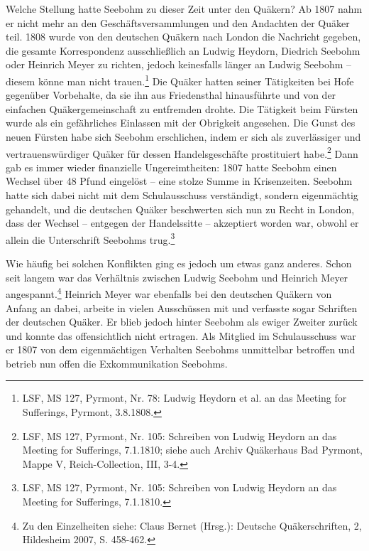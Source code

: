 Welche Stellung hatte Seebohm zu dieser Zeit unter den Quäkern? Ab 1807 nahm er
nicht mehr an den Geschäftsversammlungen und
den Andachten der Quäker teil. 1808 wurde von den
deutschen Quäkern nach London die Nachricht
gegeben, die gesamte Korrespondenz ausschließlich an Ludwig
Heydorn, Diedrich
Seebohm oder Heinrich
Meyer zu richten, jedoch keinesfalls länger an
Ludwig Seebohm -- diesem könne man nicht trauen.\footnote{LSF, MS 127, Pyrmont,
Nr. 78: Ludwig Heydorn et al. an das Meeting for
Sufferings, Pyrmont, 3.8.1808.} Die Quäker hatten seiner Tätigkeiten bei Hofe
gegenüber Vorbehalte, da sie ihn aus Friedensthal hinausführte und von der
einfachen Quäkergemeinschaft zu entfremden drohte. Die Tätigkeit beim Fürsten
wurde als ein gefährliches Einlassen mit der Obrigkeit angesehen. Die Gunst des
neuen Fürsten habe sich Seebohm erschlichen, indem er sich als zuverlässiger und
vertrauenswürdiger Quäker für dessen Handelsgeschäfte
prostituiert habe.\footnote{LSF, MS 127, Pyrmont, Nr. 105:
Schreiben von Ludwig Heydorn an das Meeting
for Sufferings, 7.1.1810; siehe auch Archiv Quäkerhaus Bad Pyrmont, Mappe V,
Reich-Collection, III, 3-4.}
Dann gab es immer wieder finanzielle Ungereimtheiten: 1807 hatte Seebohm einen
Wechsel über 48 Pfund eingelöst -- eine stolze Summe in Krisenzeiten. Seebohm
hatte sich dabei nicht mit dem Schulausschuss
verständigt, sondern eigenmächtig gehandelt, und die deutschen Quäker
beschwerten sich nun zu Recht in London, dass der Wechsel -- entgegen der
Handelssitte -- akzeptiert worden war, obwohl er allein die Unterschrift
Seebohms trug.\footnote{LSF, MS 127, Pyrmont, Nr. 105: Schreiben von Ludwig
Heydorn an das Meeting
for Sufferings, 7.1.1810.}

\medskip

Wie häufig bei solchen Konflikten ging es jedoch um
etwas ganz anderes. Schon seit langem war das Verhältnis zwischen Ludwig Seebohm
und Heinrich Meyer angespannt.\footnote{Zu den Einzelheiten siehe: Claus Bernet
(Hrsg.): Deutsche Quäkerschriften,
2, Hildesheim 2007, S. 458-462.} Heinrich Meyer war ebenfalls bei den deutschen
Quäkern von Anfang an dabei, arbeite in vielen Ausschüssen mit und verfasste
sogar Schriften der deutschen Quäker. Er blieb jedoch hinter Seebohm als ewiger
Zweiter zurück und konnte das offensichtlich nicht ertragen. Als Mitglied im
Schulausschuss war er 1807 von dem eigenmächtigen Verhalten Seebohms unmittelbar
betroffen und betrieb nun offen die
Exkommunikation Seebohms.

